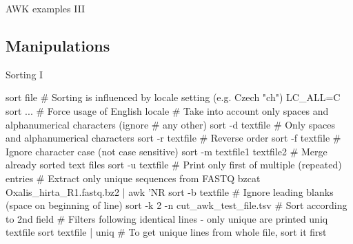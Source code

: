 \documentclass[compress, xelatex, 11pt, xcolor=svgnames, aspectratio=169, url={hyphens, lowtilde}]{beamer}
\begin{document}
\begin{frame}[fragile]{AWK examples III} %
\end{frame}

\subsection{Manipulations}

\begin{frame}[fragile]{Sorting I}
	\begin{bashcode}
    sort file # Sorting is influenced by locale setting (e.g. Czech "ch")
    LC_ALL=C sort ... # Force usage of English locale
    # Take into account only spaces and alphanumerical characters (ignore
    # any other)
    sort -d textfile # Only spaces and alphanumerical characters
    sort -r textfile # Reverse order
    sort -f textfile # Ignore character case (not case sensitive)
    sort -m textfile1 textfile2 # Merge already sorted text files
    sort -u textfile # Print only first of multiple (repeated) entries
    # Extract only unique sequences from FASTQ
    bzcat Oxalis_hirta_R1.fastq.bz2 | awk 'NR%
    sort -b textfile # Ignore leading blanks (space on beginning of line)
    sort -k 2 -n cut_awk_test_file.tsv # Sort according to 2nd field
    # Filters following identical lines - only unique are printed
    uniq textfile
    sort textfile | uniq # To get unique lines from whole file, sort it first
	\end{bashcode}
\end{frame}
\end{document}
